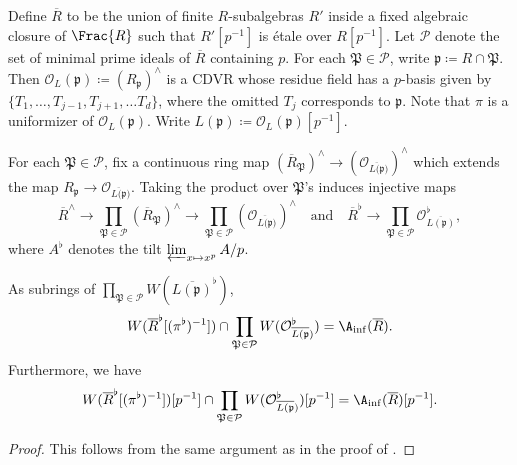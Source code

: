 \begin{notation} \label{notation:localization}
Define $\overline{R}$ to be the union of finite $R$-subalgebras $R'$ inside a fixed algebraic closure of $\Frac{R}$ such that $R'[p^{-1}]$ is \'etale over $R[p^{-1}]$. Let $\mathcal{P}$ denote the set of minimal prime ideals of $\overline{R}$ containing $p$. For each $\mathfrak{P} \in \mathcal{P}$, write $\mathfrak{p} \coloneqq R \cap \mathfrak{P}$. Then $ \mathcal{O}_L(\mathfrak{p}) \coloneqq (R_{\mathfrak{p}})^{\wedge}$ is a CDVR whose residue field has a $p$-basis given by $\{ T_1, \ldots, T_{j-1}, T_{j+1}, \ldots T_d \}$, where the omitted $T_j$ corresponds to $\mathfrak{p}$. Note that $\pi$ is a uniformizer of $\mathcal{O}_L(\mathfrak{p})$. Write $L(\mathfrak{p}) \coloneqq \mathcal{O}_L(\mathfrak{p})[p^{-1}]$. 

For each $\mathfrak{P} \in \mathcal{P}$, fix a continuous ring map $(\overline{R}_{\mathfrak{P}})^{\wedge} \rightarrow (\mathcal{O}_{\overline{L(\mathfrak{p}})})^{\wedge}$ which extends the map $R_{\mathfrak{p}} \rightarrow \mathcal{O}_{\overline{L(\mathfrak{p}})}$. 
Taking the product over $\mathfrak{P}$'s induces injective maps
\[
\overline{R}^{\wedge} \rightarrow \prod_{\mathfrak{P} \in \mathcal{P}} (\overline{R}_{\mathfrak{P}})^{\wedge} \rightarrow \prod_{\mathfrak{P} \in \mathcal{P}} (\mathcal{O}_{\overline{L(\mathfrak{p}})})^{\wedge} \quad \text{and} \quad \overline{R}^{\flat} \rightarrow \prod_{\mathfrak{P} \in \mathcal{P}} \mathcal{O}_{\overline{L(\mathfrak{p})}}^{\flat},
\]
where $A^\flat$ denotes the tilt $\varprojlim_{x\mapsto x^p} A/p$.
\end{notation}


\begin{lem} \label{lem:intersection-A_inf-localizations}
As subrings of $\prod_{\mathfrak{P} \in \mathcal{P}} W(\overline{L(\mathfrak{p})}^{\flat})$, 
\[
W(\overline{R}^\flat[(\pi^{\flat})^{-1}]) \cap \prod_{\mathfrak{P} \in \mathcal{P}} W(\mathcal{O}_{\overline{L(\mathfrak{p}})}^{\flat}) = \A_\mathrm{inf}(\overline{R}).
\]
Furthermore, we have
\[
W(\overline{R}^\flat[(\pi^{\flat})^{-1}])[p^{-1}] \cap \prod_{\mathfrak{P} \in \mathcal{P}} W(\mathcal{O}_{\overline{L(\mathfrak{p}})}^{\flat})[p^{-1}] = \A_\mathrm{inf}(\overline{R})[p^{-1}].
\]
\end{lem}

\begin{proof}
This follows from the same argument as in the proof of \cite[Lem.~3.32]{du-liu-moon-shimizu-completed-prismatic-F-crystal-loc-system}.    
\end{proof}




